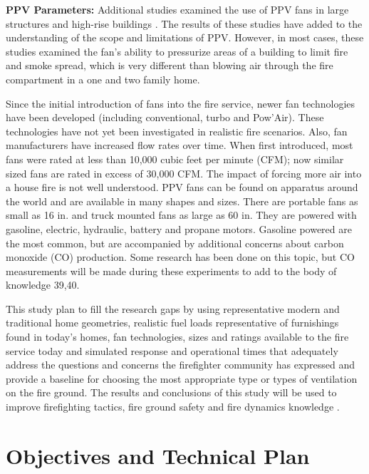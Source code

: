 \documentclass{article}
\begin{document}
\textbf{PPV Parameters:} \mbox{}Additional studies examined the use of PPV fans in large structures and high-rise buildings \cite{SymposiumHighRisePPV} \cite{KerberMadrzyPPVInLargeStructures} \cite{KerberMadrzyPPVInHighRise}. The results of these studies have added to the understanding of the scope and limitations of PPV. However, in most cases, these studies examined the fan’s ability to pressurize areas of a building to limit fire and smoke spread, which is very different than blowing air through the fire compartment in a one and two family home. 

Since the initial introduction of fans into the fire service, newer fan technologies have been developed (including conventional, turbo and Pow’Air). These technologies have not yet been investigated in realistic fire scenarios. Also, fan manufacturers have increased flow rates over time. When first introduced, most fans were rated at less than 10,000 cubic feet per minute (CFM); now similar sized fans are rated in excess of 30,000 CFM. The impact of forcing more air into a house fire is not well understood. PPV fans can be found on apparatus around the world and are available in many shapes and sizes. There are portable fans as small as 16 in. and truck mounted fans as large as 60 in. They are powered with gasoline, electric, hydraulic, battery and propane motors. Gasoline powered are the most common, but are accompanied by additional concerns about carbon monoxide (CO) production. Some research has been done on this topic, but CO measurements will be made during these experiments to add to the body of knowledge 39,40. 

This study plan to fill the research gaps by using representative modern and traditional home geometries, realistic fuel loads representative of furnishings found in today’s homes, fan technologies, sizes and ratings available to the fire service today and simulated response and operational times that adequately address the questions and concerns the firefighter community has expressed and provide a baseline for choosing the most appropriate type or types of ventilation on the fire ground. The results and conclusions of this study will be used to improve firefighting tactics, fire ground safety and fire dynamics knowledge \cite{KerberMadrzyPPVInHighRise} \cite{LougheedPPVHighRise}.

\section{Objectives and Technical Plan}
\end{document}
